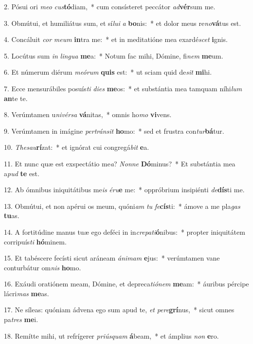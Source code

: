 2. Pósui ori \textit{me}\textit{o} \textit{cus}\textbf{tó}diam,~*  cum consísteret peccátor \textit{ad}\textbf{vér}sum me.\

3. Obmútui, et humiliátus sum, et sí\textit{lu}\textit{i} \textit{a} \textbf{bo}nis:~*  et dolor meus re\textit{no}\textbf{vá}tus est.\

4. Concáluit \textit{cor} \textit{me}\textit{um} \textbf{in}tra me:~*  et in meditatióne mea exardé\textit{scet} \textbf{i}gnis.\

5. Locútus sum \textit{in} \textit{lin}\textit{gua} \textbf{me}a:~*  Notum fac mihi, Dómine, fi\textit{nem} \textbf{me}um.\

6. Et númerum diérum \textit{me}\textit{ó}\textit{rum} \textbf{quis} est:~*  ut sciam quid de\textit{sit} \textbf{mi}hi.\

7. Ecce mensurábiles posuís\textit{ti} \textit{di}\textit{es} \textbf{me}os:~*  et substántia mea tamquam níhi\textit{lum} \textbf{an}te te.\

8. Verúmtamen u\textit{ni}\textit{vér}\textit{sa} \textbf{vá}nitas,~*  omnis ho\textit{mo} \textbf{vi}vens.\

9. Verúmtamen in imágine \textit{per}\textit{tráns}\textit{it} \textbf{ho}mo:~*  sed et frustra con\textit{tur}\textbf{bá}tur.\

10. \textit{The}\textit{sau}\textbf{rí}zat:~*  et ignórat cui congregá\textit{bit} \textbf{e}a.\

11. Et nunc quæ est exspectátio me\textit{a}? \textit{Non}\textit{ne} \textbf{Dó}minus?~*  Et substántia mea a\textit{pud} \textbf{te} est.\

12. Ab ómnibus iniquitátibus me\textit{is} \textit{é}\textit{ru}\textbf{e} me:~*  oppróbrium insipiénti \textit{de}\textbf{dís}ti me.\

13. Obmútui, et non apérui os meum, quóni\textit{am} \textit{tu} \textit{fe}\textbf{cís}ti:~*  ámove a me pla\textit{gas} \textbf{tu}as.\

14. A fortitúdine manus tuæ ego deféci in in\textit{cre}\textit{pa}\textit{ti}\textbf{ó}nibus:~*  propter iniquitátem corripuís\textit{ti} \textbf{hó}minem.\

15. Et tabéscere fecísti sicut aráneam \textit{á}\textit{ni}\textit{mam} \textbf{e}jus:~*  verúmtamen vane conturbátur om\textit{nis} \textbf{ho}mo.\

16. Exáudi oratiónem meam, Dómine, et depreca\textit{ti}\textit{ó}\textit{nem} \textbf{me}am:~*  áuribus pércipe lácri\textit{mas} \textbf{me}as.\

17. Ne síleas: quóniam ádvena ego sum apud te, \textit{et} \textit{per}\textit{e}\textbf{grí}nus,~*  sicut omnes pa\textit{tres} \textbf{me}i.\

18. Remítte mihi, ut refrígerer \textit{pri}\textit{ús}\textit{quam} \textbf{á}beam,~*  et ámplius \textit{non} \textbf{e}ro.\

